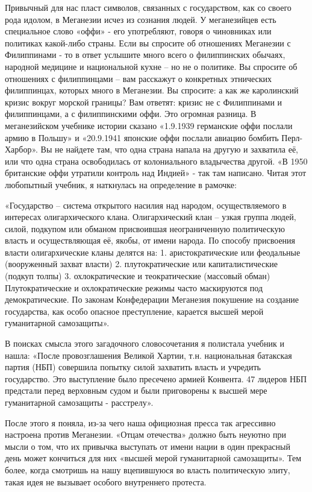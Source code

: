 \documentclass{book}
\begin{document}
Привычный для нас пласт символов, связанных с государством, как со своего рода идолом, в Меганезии исчез из сознания людей. У меганезийцев есть специальное слово «оффи» - его употребляют, говоря о чиновниках или политиках какой-либо страны. Если вы спросите об отношениях Меганезии с Филиппинами - то в ответ услышите много всего о филиппинских обычаях, народной медицине и национальной кухне -- но не о политике. Вы спросите об отношениях с филиппинцами -- вам расскажут о конкретных этнических филиппинцах, которых много в Меганезии. Вы спросите: а как же каролинский кризис вокруг морской границы? Вам ответят: кризис не с Филиппинами и филиппинцами, а с филиппинскими оффи. Это огромная разница. В меганезийском учебнике истории сказано «1.9.1939 германские оффи послали армию в Польшу» и «20.9.1941 японские оффи послали авиацию бомбить Перл-Харбор». Вы не найдете там, что одна страна напала на другую и захватила её, или что одна страна освободилась от колониального владычества другой. «В 1950 британские оффи утратили контроль над Индией» - так там написано. Читая этот любопытный учебник, я наткнулась на определение в рамочке:

«Государство -- система открытого насилия над народом, осуществляемого в интересах олигархического клана. Олигархический клан -- узкая группа людей, силой, подкупом или обманом присвоившая неограниченную политическую власть и осуществляющая её, якобы, от имени народа. По способу присвоения власти олигархические кланы делятся на:
1. аристократические или феодальные (вооруженный захват власти)
2. плутократические или капиталистические (подкуп толпы)
3. охлократические и теократические (массовый обман)
Плутократические и охлократические режимы часто маскируются под демократические. По законам Конфедерации Меганезия покушение на создание государства, как особо опасное преступление, карается высшей мерой гуманитарной самозащиты».
 
В поисках смысла этого загадочного словосочетания я полистала учебник и нашла: «После провозглашения Великой Хартии, т.н. национальная батакская партия (НБП) совершила попытку силой захватить власть и учредить государство. Это выступление было пресечено армией Конвента. 47 лидеров НБП предстали перед верховным судом и были приговорены к высшей мере гуманитарной самозащиты - расстрелу».

После этого я поняла, из-за чего наша официозная пресса так агрессивно настроена против Меганезии. «Отцам отечества» должно быть неуютно при мысли о том, что их привычка выступать от имени нации в один прекрасный день может кончиться для них «высшей мерой гуманитарной самозащиты». Тем более, когда смотришь на нашу вцепившуюся во власть политическую элиту, такая идея не вызывает особого внутреннего протеста.
\end{document}
